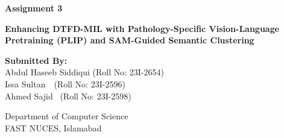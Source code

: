 \documentclass[12pt, a4paper]{article}
\begin{document}
\begin{titlepage}
    \begin{center}
        \vspace*{2cm}
        
        \Huge
        \textbf{\textcolor{primary}{Assignment 3}}
        
        \vspace{0.5cm}
        \LARGE
        \textbf{Enhancing DTFD-MIL with Pathology-Specific Vision-Language Pretraining (PLIP) and SAM-Guided Semantic Clustering}
        
        \vspace{2cm}
        
        \textbf{Submitted By:}\\
        \vspace{0.5cm}
        \Large
        Abdul Haseeb Siddiqui \quad (Roll No: 23I-2654) \\
        Issa Sultan \quad\quad\quad\quad\,\, (Roll No: 23I-2596) \\
        Ahmed Sajid \quad\quad\quad\quad\, (Roll No: 23I-2598) \\
        
        \vfill
        
        \Large
        Department of Computer Science\\
        FAST NUCES, Islamabad\\
        \vspace{0.8cm}
        
    \end{center}
\end{titlepage}

\end{document}
